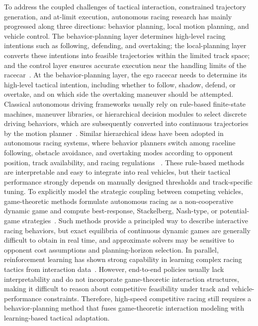\documentclass{iopjournal}
\begin{document}
To address the coupled challenges of tactical interaction, constrained
trajectory generation, and at-limit execution, autonomous racing research has
mainly progressed along three directions: behavior planning, local motion
planning, and vehicle control. The behavior-planning layer determines
high-level racing intentions such as following, defending, and overtaking; the
local-planning layer converts these intentions into feasible trajectories
within the limited track space; and the control layer ensures accurate
execution near the handling limits of the racecar~\cite{paden2016survey,
gonzalez2016review,betz2022survey}.
At the behavior-planning layer, the ego racecar needs to determine its
high-level tactical intention, including whether to follow, shadow, defend, or
overtake, and on which side the overtaking maneuver should be attempted.
Classical autonomous driving frameworks usually rely on rule-based finite-state
machines, maneuver libraries, or hierarchical decision modules to select
discrete driving behaviors, which are subsequently converted into continuous
trajectories by the motion planner~\cite{werling2010frenet,ziegler2014baidu}.
Similar hierarchical ideas have been
adopted in autonomous racing systems, where behavior planners switch among
raceline following, obstacle avoidance, and overtaking modes according to
opponent position, track availability, and racing regulations
~\cite{betz2019architecture,kabzan2020amzracing,betz2022survey,
jung2023iac}. These rule-based methods are interpretable
and easy to integrate into real vehicles, but their tactical performance
strongly depends on manually designed thresholds and track-specific tuning.
To explicitly model the strategic coupling between competing vehicles,
game-theoretic methods formulate autonomous racing as a non-cooperative
dynamic game and compute best-response, Stackelberg, Nash-type, or
potential-game strategies~\cite{liniger2019game,wang2021game,
laine2021multi,spica2020game,jia2023bayesian,
kalaria2025alpha}. Such methods provide a principled way to describe
interactive racing behaviors, but exact equilibria of continuous dynamic games
are generally difficult to obtain in real time, and approximate solvers may be
sensitive to opponent cost assumptions and planning-horizon selection. In
parallel, reinforcement learning has shown strong capability in learning
complex racing tactics from interaction data~\cite{wurman2022gtsophy,
fuchs2021superhuman,song2021overtaking,kaufmann2023drone,lin2023limit}.
However, end-to-end policies usually lack interpretability and do not
incorporate game-theoretic interaction structures, making it difficult to
reason about competitive feasibility under track and vehicle-performance
constraints. Therefore, high-speed competitive racing still
requires a behavior-planning method that fuses game-theoretic interaction
modeling with learning-based tactical adaptation.
\end{document}
